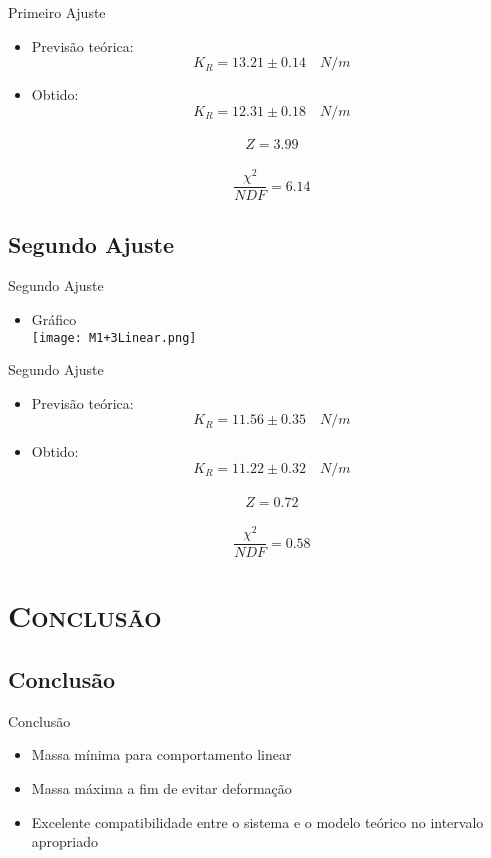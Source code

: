 \documentclass[xcolor=x11names,compress]{beamer}
\renewcommand{\(}{\begin{columns}}
\renewcommand{\)}{\end{columns}}
\newcommand{\<}[1]{\begin{column}{#1}}
\renewcommand{\>}{\end{column}}
\begin{document}
\begin{frame}{Primeiro Ajuste}
    \begin{itemize}
        \item Previsão teórica: \[K_{R} = 13.21 \pm 0.14 \quad N/m\]
        \item Obtido: \[K_{R} = 12.31 \pm 0.18 \quad N/m\]\\
            \[Z = 3.99\]\\
            \[\frac{\chi^{2}}{NDF} = 6.14\]
    \end{itemize}
\end{frame}



\subsection{Segundo Ajuste}

\begin{frame}{Segundo Ajuste}
    \begin{itemize}
        \item Gráfico\\
            \texttt{[image: M1+3Linear.png]}
    \end{itemize}
\end{frame}


\begin{frame}{Segundo Ajuste}
    \begin{itemize}
        \item Previsão teórica: \[K_{R} = 11.56 \pm 0.35 \quad N/m\]
        \item Obtido: \[K_{R} = 11.22 \pm 0.32 \quad N/m\]\\
            \[Z = 0.72\]\\
            \[\frac{\chi^{2}}{NDF} = 0.58\]
    \end{itemize}
\end{frame}


\section{\scshape Conclusão}


\subsection{Conclusão}

\begin{frame}{Conclusão}
    \begin{itemize}
        \item Massa mínima para comportamento linear
        \item Massa máxima a fim de evitar deformação
        \item Excelente compatibilidade entre o sistema e o modelo teórico no intervalo apropriado
    \end{itemize}
\end{frame}
\end{document}
